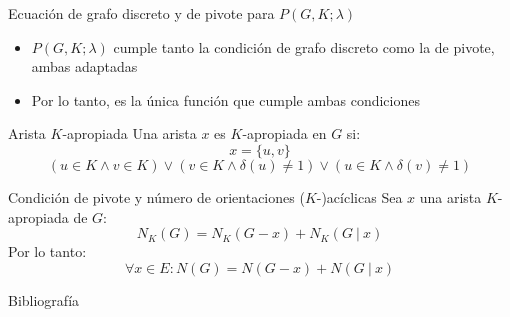\documentclass{beamer}
\begin{document}
\begin{frame}{Ecuación de grafo discreto y de pivote para $P(G, K; \lambda)$}
    \begin{itemize}
        \item<1-> $P(G, K; \lambda)$ cumple tanto la condición de grafo discreto como la de pivote, ambas adaptadas
        \item<2-> Por lo tanto, es la única función que cumple ambas condiciones
    \end{itemize}
\end{frame}

\begin{frame}{Arista $K$-apropiada}
    Una arista $x$ es $K$-apropiada en $G$ si:
    \begin{equation*}
        x = \{u, v\}
    \end{equation*}
    \begin{equation*}
        (u \in K \land v \in K) \lor (v \in K \land \delta(u) \neq 1) \lor (u \in K \land \delta(v) \neq 1)
    \end{equation*}
\end{frame}

\begin{frame}{Condición de pivote y número de orientaciones ($K$-)acíclicas}
    Sea $x$ una arista $K$-apropiada de $G$:
    \begin{equation*}
        N_K(G) = N_K(G - x) + N_K(G\ |\ x)
    \end{equation*}
    Por lo tanto:
    \begin{equation*}
        \forall x \in E : N(G) = N(G - x) + N(G\ |\ x)
    \end{equation*}
\end{frame}

\begin{frame}{Bibliografía}
    \printbibliography[title={Bibliografía}]
\end{frame}
\end{document}
